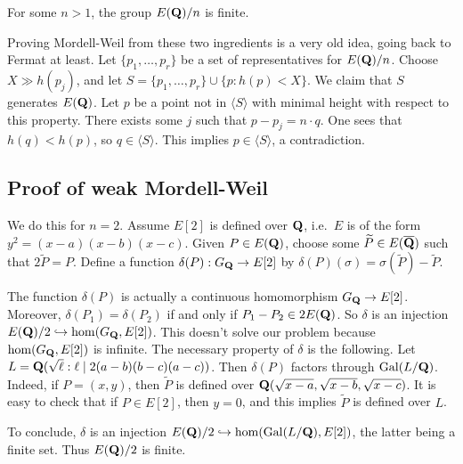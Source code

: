 \begin{theo}
For some $n>1$, the group $E(\mathbf{Q})/n$ is finite. 
\end{theo}

Proving Mordell-Weil from these two ingredients is a very old idea, going back 
to Fermat at least. Let $\{p_1,\dots,p_r\}$ be a set of representatives for 
$E(\mathbf{Q})/n$. Choose $X\gg h(p_j)$, and let 
$S=\{p_1,\dots,p_r\}\cup \{p:h(p)<X\}$. We claim that $S$ generates $E(\mathbf{Q})$. 
Let $p$ be a point not in $\langle S\rangle$ with minimal height with respect 
to this property. There exists some $j$ such that $p-p_j=n\cdot q$. One sees 
that $h(q)<h(p)$, so $q\in \langle S\rangle$. This implies 
$p\in \langle S\rangle$, a contradiction. 





\subsection{Proof of weak Mordell-Weil}

We do this for $n=2$. Assume $E[2]$ is defined over $\mathbf{Q}$, i.e.~$E$ is of the 
form $y^2=(x-a)(x-b)(x-c)$. Given $P\in E(\mathbf{Q})$, choose some 
$\widetilde P\in E(\overline{\mathbf{Q}})$ such that $2\widetilde P=P$. Define a 
function $\delta(P):G_{\mathbf{Q}} \to E[2]$ by 
$\delta(P)(\sigma) = \sigma(\widetilde P)-\widetilde P$. 

The function $\delta(P)$ is actually a continuous homomorphism 
$G_{\mathbf{Q}} \to E[2]$. Moreover, $\delta(P_1)=\delta(P_2)$ if and only if 
$P_1-P_2\in 2 E(\mathbf{Q})$. So $\delta$ is an injection 
$E(\mathbf{Q})/2 \hookrightarrow \hom(G_{\mathbf{Q}},E[2])$. This doesn't solve our problem 
because $\hom(G_{\mathbf{Q}},E[2])$ is infinite. The necessary property of $\delta$ is 
the following. Let $L=\mathbf{Q}(\sqrt\ell:\ell\mid 2(a-b)(b-c)(a-c))$. Then 
$\delta(P)$ factors through $\operatorname{Gal}(L/\mathbf{Q})$. Indeed, if 
$P=(x,y)$, then $\widetilde P$ is defined over 
$\mathbf{Q}(\sqrt{x-a},\sqrt{x-b},\sqrt{x-c})$. It is easy to check that if 
$P\in E[2]$, then $y=0$, and this implies $\widetilde P$ is defined over 
$L$. 

To conclude, $\delta$ is an injection 
$E(\mathbf{Q})/2\hookrightarrow \hom(\operatorname{Gal}(L/\mathbf{Q}),E[2])$, the latter being a finite 
set. Thus $E(\mathbf{Q})/2$ is finite. 

